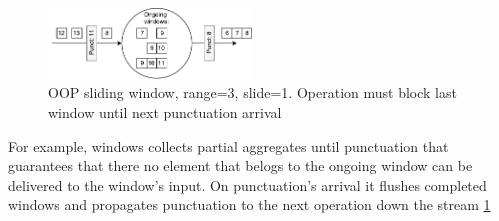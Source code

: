 \begin{figure}[htbp]
  \centering
  \includegraphics[width=0.48\textwidth]{pics/oop}
  \caption{OOP sliding window, range=3, slide=1. Operation must block last window until next punctuation arrival }
  \label {oop}
\end{figure}

For example, windows collects partial aggregates until punctuation that guarantees that there no element that belogs to the ongoing window can be delivered to the window's input. On punctuation's arrival it flushes completed windows and propagates punctuation to the next operation down the stream \ref{oop}
